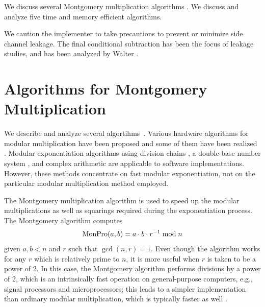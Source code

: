 \documentclass[twocolumn]{svjour3}          %
\begin{document}
We discuss several Montgomery multiplication algorithms
\cite{M85:Modular}.  We discuss and analyze five time and memory
efficient algorithms.

We caution the implementer to take precautions to prevent or minimize
side channel leakage. The final conditional subtraction has been the focus
of leakage studies, and has been analyzed by Walter \cite{W08:Leakage}.

\section{Algorithms for Montgomery Multiplication}

We describe and analyze several algortihms~\cite{KAK96:Analyzing}. 
Various hardware algorithms for modular multiplication have been
proposed and some of them have been realized
\cite{B89:A,T91:A,OK91:A}.  Modular exponentiation algorithms using
division chains \cite{W97:Exponentiation}, a double-base number system
\cite{DJM97:Theory}, and complex arithmetic \cite{DJM97:Algorithms}
are applicable to software implementations. However, these methods
concentrate on fast modular exponentiation, not on the particular
modular multiplication method employed.

The Montgomery multiplication algorithm is used to speed up the
modular multiplications as well as squarings required during the
exponentiation process. The Montgomery algorithm computes
%
\begin{equation}
\mbox{MonPro}(a,b)=a \cdot b \cdot r^{-1} \bmod{n}
\label{monpro1}
\end{equation}
%
given $a,b<n$ and $r$ such that $\gcd(n,r)=1$. Even though the
algorithm works for any $r$ which is relatively prime to $n$, it is
more useful when $r$ is taken to be a power of 2. In this case, the
Montgomery algorithm performs divisions by a power of 2, which is an
intrinsically fast operation on general-purpose computers, e.g.,
signal processors and microprocessors; this leads to a simpler
implementation than ordinary modular multiplication, which is
typically faster as well \cite{NMR95:Can}.
\end{document}

